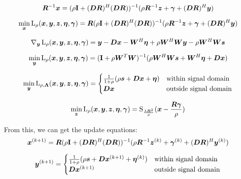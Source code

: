 \documentclass{article}
\begin{document}
\begin{equation}
\bm{R}^{-1}\bm{x} = (\rho{\bf I} + (\bm{D}\bm{R})^H(\bm{D}\bm{R}))^{-1}(\rho\bm{R}^{-1}\bm{z} + \bm{\gamma} + (\bm{D}\bm{R})^H\bm{y})
\end{equation}

\begin{equation}
\min_{\bm{x}} \operatorname{L}_{\rho}(\bm{x},\bm{y},\bm{z},\bm{\eta},\bm{\gamma}) = \bm{R}(\rho{\bf I} + (\bm{D}\bm{R})^H(\bm{D}\bm{R}))^{-1}(\rho\bm{R}^{-1}\bm{z} + \bm{\gamma} + (\bm{D}\bm{R})^H\bm{y})
\end{equation}

\begin{equation}
\nabla_{\bm{y}}\operatorname{L}_{\rho}(\bm{x},\bm{y},\bm{z},\bm{\eta},\bm{\gamma}) = \bm{y} - \bm{D}\bm{x} - \bm{W}^H\bm{\eta} + \rho\bm{W}^H\bm{W}\bm{y} - \rho\bm{W}^H\bm{W}\bm{s}
\end{equation}

\begin{equation}
\min_{\bm{y}} \operatorname{L}_{\rho}(\bm{x},\bm{y},\bm{z},\bm{\eta},\bm{\gamma}) = ({\bf I} + \rho\bm{W}^T\bm{W})^{-1}(\rho\bm{W}^H\bm{W}\bm{s} + \bm{W}^H\bm{\eta} +\bm{D}\bm{x})
\end{equation}

\begin{equation}
\min_{\bm{y}} \operatorname{L}_{\rho,\bm{\Lambda}}(\bm{x},\bm{y},\bm{z},\bm{\eta},\bm{\gamma}) = \begin{cases}
\frac{1}{1 + \rho}(\rho\bm{s} + \bm{D}\bm{x} + \bm{\eta}) & \text{within signal domain}\\
\bm{D}\bm{x} & \text{outside signal domain}
\end{cases}
\end{equation}

\begin{equation}
\min_{\bm{z}} \operatorname{L}_{\rho}(\bm{x},\bm{y},\bm{z},\bm{\eta},\bm{\gamma}) = \operatorname{S}_{\frac{\lambda\bm{R}^2}{\rho}}(\bm{x} - \frac{\bm{R}\bm{\gamma}}{\rho})
\end{equation}

From this, we can get the update equations:
\begin{equation}
\bm{x}^{(k + 1)} = \bm{R}(\rho{\bf I} + (\bm{D}\bm{R})^H(\bm{D}\bm{R}))^{-1}(\rho\bm{R}^{-1}\bm{z}^{(k)} + \bm{\gamma}^{(k)} + (\bm{D}\bm{R})^H\bm{y}^{(k)})
\end{equation}

\begin{equation}
\bm{y}^{(k + 1)}= \begin{cases}
\frac{1}{1 + \rho}(\rho\bm{s} + \bm{D}\bm{x}^{(k + 1)} + \bm{\eta}^{(k)}) & \text{within signal domain}\\
\bm{D}\bm{x}^{(k + 1)} & \text{outside signal domain}
\end{cases}
\end{equation}
\end{document}
